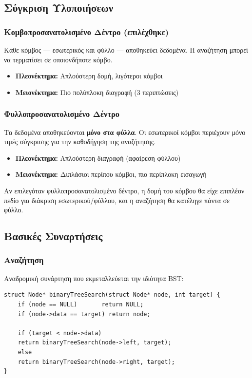 \documentclass[a4paper,12pt]{article}
\begin{document}
	\subsection{Σύγκριση Υλοποιήσεων}
	
	\subsubsection{Κομβοπροσανατολισμένο Δέντρο (επιλέχθηκε)}
	Κάθε κόμβος — εσωτερικός και φύλλο — αποθηκεύει δεδομένα. Η αναζήτηση 
	μπορεί να τερματίσει σε οποιονδήποτε κόμβο.
	
	\begin{itemize}
		\item \textbf{Πλεονέκτημα:} Απλούστερη δομή, λιγότεροι κόμβοι
		\item \textbf{Μειονέκτημα:} Πιο πολύπλοκη διαγραφή (3 περιπτώσεις)
	\end{itemize}
	
	\subsubsection{Φυλλοπροσανατολισμένο Δέντρο}
	Τα δεδομένα αποθηκεύονται \textbf{μόνο στα φύλλα}. Οι εσωτερικοί κόμβοι 
	περιέχουν μόνο τιμές σύγκρισης για την καθοδήγηση της αναζήτησης.
	
	\begin{itemize}
		\item \textbf{Πλεονέκτημα:} Απλούστερη διαγραφή (αφαίρεση φύλλου)
		\item \textbf{Μειονέκτημα:} Διπλάσιοι περίπου κόμβοι, πιο περίπλοκη εισαγωγή
	\end{itemize}
	
	Αν επιλεγόταν φυλλοπροσανατολισμένο δέντρο, η δομή του κόμβου θα είχε 
	επιπλέον πεδίο για διάκριση εσωτερικού/φύλλου, και η αναζήτηση θα 
	κατέληγε πάντα σε φύλλο.
	
	\subsection{Βασικές Συναρτήσεις}
	
	\subsubsection{Αναζήτηση}
	Αναδρομική συνάρτηση που εκμεταλλεύεται την ιδιότητα BST:
	
	\begin{lstlisting}
struct Node* binaryTreeSearch(struct Node* node, int target) {
	if (node == NULL)       return NULL;
	if (node->data == target) return node;
	
	if (target < node->data)
	return binaryTreeSearch(node->left, target);
	else
	return binaryTreeSearch(node->right, target);
}
	\end{lstlisting}
	
\end{document}

